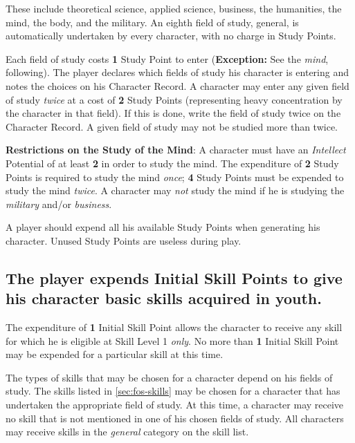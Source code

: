 These include theoretical science, applied science, business, the
humanities, the mind, the body, and the military. An eighth field of
study, general, is automatically undertaken by every character, with
no charge in Study Points.

Each field of study costs \textbf{1} Study Point to enter
(\textbf{Exception:} See the \emph{mind}, following). The player
declares which fields of study his character is entering and notes the
choices on his Character Record. A character may enter any given field
of study \emph{twice} at a cost of \textbf{2} Study Points
(representing heavy concentration by the character in that field). If
this is done, write the field of study twice on the Character Record.
A given field of study may not be studied more than twice.

\textbf{Restrictions on the Study of the Mind}: A character must have an
\emph{Intellect} Potential of at least \textbf{2} in order to study
the mind. The expenditure of \textbf{2} Study Points is required to
study the mind \emph{once}; \textbf{4} Study Points must be expended
to study the mind \emph{twice}. A character may \emph{not} study the
mind if he is studying the \emph{military} and/or \emph{business}.

A player should expend all his available Study Points when generating
his character. Unused Study Points are useless during play.


\subsection[Initial Skill Points]{The player expends Initial Skill
  Points to give his character basic skills acquired in youth.}
\label{sec:init-sp}



The expenditure of \textbf{1} Initial Skill Point allows the character
to receive any skill for which he is eligible at Skill Level
1 \emph{only}. No more than \textbf{1} Initial Skill Point
may be expended for a particular skill at this time.

The types of skills that may be chosen for a character depend on his
fields of study. The skills listed in \ref{sec:fos-skills} may be chosen for
a character that has undertaken the appropriate field of study. At
this time, a character may receive no skill that is not mentioned in
one of his chosen fields of study. All characters may receive skills
in the \emph{general} category on the skill list.

